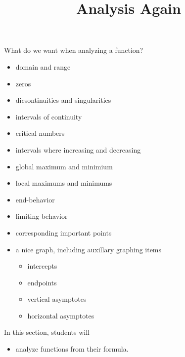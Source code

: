 \documentclass{ximera}
\title{Analysis Again}
\begin{document}
\begin{abstract}
%
\end{abstract}
\maketitle






What do we want when analyzing a function?


\begin{itemize}
\item domain and range
\item zeros 
\item dicsontinuities and singularities
\item intervals of continuity
\item critical numbers
\item intervals where increasing and decreasing
\item global maximum and minimium
\item local maximums and minimums
\item end-behavior
\item limiting behavior
\item corresponding important points
\item a nice graph, including auxillary graphing items
\begin{itemize}
	\item intercepts
	\item endpoints
	\item vertical asymptotes
	\item horizontal asymptotes
\end{itemize}
\end{itemize}




\begin{sectionOutcomes}
In this section, students will 

\begin{itemize}
\item analyze functions from their formula.
\end{itemize}
\end{sectionOutcomes}
\end{document}
